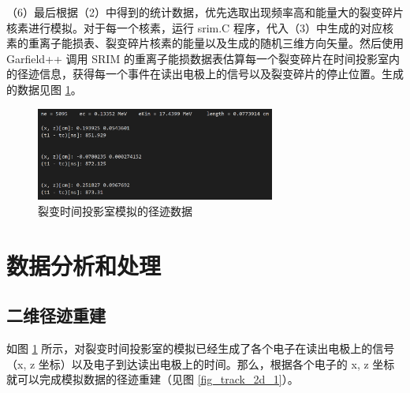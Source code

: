 \documentclass[AutoFakeBold]{LZUThesis}
\begin{document}
（6）最后根据（2）中得到的统计数据，优先选取出现频率高和能量大的裂变碎片核素进行模拟。对于每一个核素，运行 srim.C 程序，代入（3）中生成的对应核素的重离子能损表、裂变碎片核素的能量以及生成的随机三维方向矢量。然后使用 Garfield++ 调用 SRIM 的重离子能损数据表估算每一个裂变碎片在时间投影室内的径迹信息，获得每一个事件在读出电极上的信号以及裂变碎片的停止位置。生成的数据见图 \ref{fig_output}。

\begin{figure}[H]
    \centering
    \includegraphics[width=0.7\textwidth]{figures/output.png}
    \caption{裂变时间投影室模拟的径迹数据}
    \label{fig_output}
\end{figure}




\section{数据分析和处理}
\subsection{二维径迹重建}
\label{sub:二维径迹重建}
如图 \ref{fig_output} 所示，对裂变时间投影室的模拟已经生成了各个电子在读出电极上的信号（x, z 坐标）以及电子到达读出电极上的时间。那么，根据各个电子的 x, z 坐标就可以完成模拟数据的径迹重建（见图 \ref{fig_track_2d_1}）。
\end{document}
